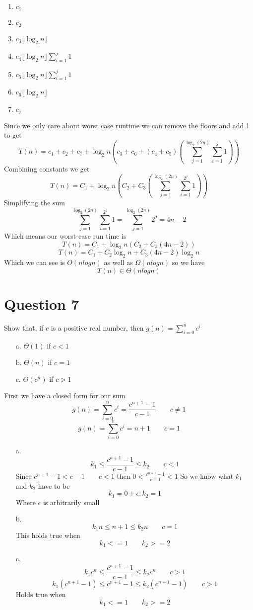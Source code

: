 \documentclass{article}
\begin{document}
\begin{enumerate}

\item $c_{1}$
\item $c_{2}$
\item $c_{3}\lfloor \log_{2}n \rfloor$
\item $c_{4}\lfloor \log_{2}n \rfloor \sum_{i=1}^{j}1$
\item $c_{5}\lfloor \log_{2}n \rfloor \sum_{i=1}^{j}1$
\item $c_{6}\lfloor \log_{2}n \rfloor$
\item $c_{7}$

\end{enumerate}
Since we only care about worst case runtime we can remove the floors and add 1 to get
$$T(n) = c_{1} + c_{2} + c_{7} + \log_{2}n(c_{3}+c_{6} + (c_{4} +c_{5})(\sum_{j=1}^{\log_{2}(2n)}\sum_{i=1}^{j}1))$$
Combining constants we get
$$T(n) = C_{1} + \log_{2}n(C_{2} + C_{3}(\sum_{j=1}^{\log_{2}(2n)}\sum_{i=1}^{2^j}1))$$
Simplifying the sum
$$\sum_{j=1}^{\log_{2}(2n)}\sum_{i=1}^{2^j}1 = \sum_{j=1}^{\log_{2}(2n)}2^j = 4n - 2$$
Which means our worst-case run time is
$$T(n) = C_{1} + \log_{2}n(C_{2} + C_{3}(4n-2))$$
$$T(n) = C_{1} + C_{2}\log_{2}n + C_{3}(4n-2)\log_{2}n$$
Which we can see is $O(nlogn)$ as well as $\Omega(nlogn)$ so we have
$$ T(n) \in \Theta(nlogn)$$

\section*{Question 7}
Show that, if $c$ is a positive real number, then $g(n) = \sum_{i=0}^{n} c^i$
\begin{enumerate}

\item[a.] $\Theta(1)$ if $c < 1$
\item[b.] $\Theta(n)$ if $c = 1$
\item[c.] $\Theta(c^n)$ if $c > 1$

\end{enumerate}

First we have a closed form for our sum
$$ g(n) = \sum_{i=0}^{n} c^i = \frac{c^{n+1}-1}{c-1} \qquad c \ne 1$$
$$ g(n) = \sum_{i=0}^{n} c^i = n + 1 \qquad c = 1 $$
\begin{enumerate}

\item[a.] $$ k_{1} \leq \frac{c^{n+1}-1}{c-1} \leq k_{2} \qquad c < 1 $$
Since $c^{n+1} - 1 < c -1 \qquad c<1$ then $0 < \frac{c^{n+1}-1}{c-1} < 1$
So we know what $k_{1}$ and $k_{2}$ have to be
$$ k_{1}=0+\epsilon; k_{2}=1$$
Where $\epsilon$ is arbitrarily small

\item[b.] $$ k_{1}n \leq n + 1 \leq k_{2}n \qquad c = 1 $$
This holds true when
$$ k_{1}<=1 \qquad k_{2}>=2 $$



\item[c.] $$ k_{1}c^n \leq \frac{c^{n+1}-1}{c-1} \leq k_{2}c^n \qquad c > 1 $$
$$  k_{1}(c^{n+1}-1) \leq c^{n+1}-1 \leq k_{2}(c^{n+1}-1) \qquad c > 1 $$
Holds true when
$$ k_{1} <=1 \qquad k_{2} >= 2$$



\end{enumerate}
\end{document}

